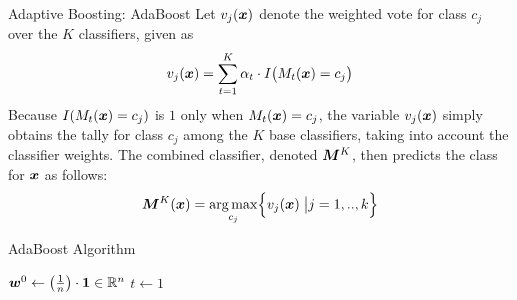 {\begin{frame}{Adaptive Boosting: AdaBoost}
\medskip
Let $v_{j}({\boldsymbol x})$ denote the
weighted vote for class $c_{j}$ over the $K$ classif\/{i}ers, given as
\begin{align*}
  v_{j}({\boldsymbol x}) = \sum_{t=1}^K \alpha_t \cdot I\bigl(M_t({\boldsymbol x})= c_{j}\bigr)
\end{align*}
Because $I(M_t({\boldsymbol x}) = c_{j})$ is $1$ only when $M_t({\boldsymbol x}) = c_{j}$, the
variable $v_{j}({\boldsymbol x})$ simply obtains the tally for class $c_{j}$ among
the $K$ base classif\/{i}ers, taking into account the classif\/{i}er
weights. The combined classif\/{i}er, denoted ${\boldsymbol M}^K$, then predicts
the class for ${\boldsymbol x}$ as follows:
\begin{align*}
  {\boldsymbol M}^K({\boldsymbol x}) = \mathop{\arg\max}_{c_{j}} \Bigl\{ v_{j}({\boldsymbol x}) \;\bigl| j=1,..,k \Bigr\}
\end{align*}
\end{frame}




\newcommand{\algAdaBoost}{\textsc{AdaBoost}}
\begin{frame}[fragile]{AdaBoost Algorithm}
\begin{small}
\begin{tightalgo}[H]{\textwidth-18pt}
\SetKwInOut{Algorithm}{\algAdaBoost ($K$, $\bD$)}
\Algorithm{}
${\boldsymbol w}^0 \gets  \left(\frac{1}{n}\right)\cdot \mathbf{1} \in {\mathord{\mathbb R}}^n$\;
$t \gets 1$\;
\end{tightalgo}
\end{small}
\end{frame}





}

